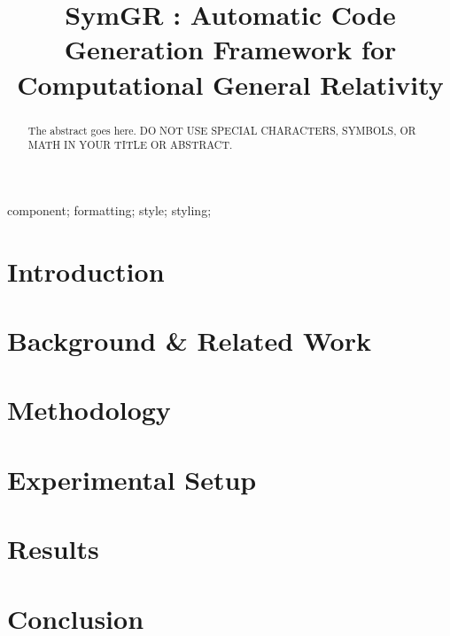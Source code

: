\documentclass[10pt, conference, compsocconf]{IEEEtran}
\begin{document}
\title{SymGR : Automatic Code Generation Framework for Computational General Relativity}

\maketitle


\begin{abstract}
The abstract goes here. DO NOT USE SPECIAL CHARACTERS, SYMBOLS, OR MATH IN YOUR TITLE OR ABSTRACT. 
\end{abstract}

\begin{IEEEkeywords}
component; formatting; style; styling;
\end{IEEEkeywords}

\IEEEpeerreviewmaketitle

\section{Introduction}


\section{Background \& Related Work}
\label{sec:bg}


\section{Methodology}
\label{sec:methods}


\section{Experimental Setup}
\label{sec:exper}


\section{Results}
\label{sec:results}


\section{Conclusion}
\label{sec:conclude}






\end{document}
